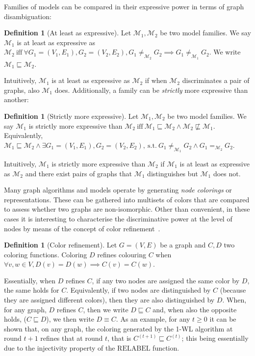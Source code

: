 \documentclass{article}
\theoremstyle{plain}
\theoremstyle{definition}
\newtheorem{definition}[theorem]{Definition}
\theoremstyle{remark}
\begin{document}
Families of models can be compared in their expressive power in terms of graph disambiguation:
\begin{definition}[At least as expressive]\label{def:at_least_as_expressive}
    Let $\mathcal{M}_1, \mathcal{M}_2$ be two model families. We say $\mathcal{M}_1$ is at least as expressive as $\mathcal{M}_2\ \mathrm{iff}\ \forall G_1 = (V_1, E_1), G_2 = (V_2, E_2), G_1 \neq_{\mathcal{M}_2} G_2 \implies G_1 \neq_{\mathcal{M}_1} G_2$. We write $\mathcal{M}_1 \sqsubseteq \mathcal{M}_2$.
\end{definition}

Intuitively, $\mathcal{M}_1$ is at least as expressive as $\mathcal{M}_2$ if when $\mathcal{M}_2$ discriminates a pair of graphs, also $\mathcal{M}_1$ does. Additionally, a family can be \emph{strictly} more expressive than another:

\begin{definition}[Strictly more expressive] \label{def:strictly_more_expressive}
    Let $\mathcal{M}_1, \mathcal{M}_2$ be two model families. We say $\mathcal{M}_1$ is strictly more expressive than $\mathcal{M}_2\ \mathrm{iff}\ \mathcal{M}_1 \sqsubseteq \mathcal{M}_2 \land \mathcal{M}_2 \not\sqsubseteq \mathcal{M}_1$. Equivalently, $\mathcal{M}_1 \sqsubseteq \mathcal{M}_2 \land \exists G_1 = (V_1, E_1), G_2 = (V_2, E_2),
    \ \mathrm{s.t.}\ G_1 \neq_{\mathcal{M}_1} G_2 \land G_1 =_{\mathcal{M}_2} G_2$.
\end{definition}

Intuitively, $\mathcal{M}_1$ is strictly more expressive than $\mathcal{M}_2$ if $\mathcal{M}_1$ is at least as expressive as $\mathcal{M}_2$ and there exist pairs of graphs that $\mathcal{M}_1$ distinguishes but $\mathcal{M}_1$ does not. 

Many graph algorithms and models operate by generating \emph{node colorings} or representations. These can be gathered into multisets of colors that are compared to assess whether two graphs are non-isomorphic. Other than convenient, in these cases it is interesting to characterise the discriminative power at the level of nodes by means of the concept of {color refinement}~\cite{morris2019weisfeiler,bodnar2022neural,bevilacqua2022equivariant}. 
\begin{definition}[Color refinement]
    Let $G = (V, E)$ be a graph and $C, D$ two coloring functions. Coloring $D$ refines colouring $C$ when $\forall v, w \in V, D(v) = D(w) \implies C(v) = C(w)$.
\end{definition}
\noindent Essentially, when $D$ refines $C$, if any two nodes are assigned the same color by $D$, the same holds for $C$. Equivalently, if two nodes are distinguished by $C$ (because they are assigned different colors), then they are also distinguished by $D$. When, for any graph, $D$ refines $C$, then we write $D \sqsubseteq C$ and, when also the opposite holds, ($C \sqsubseteq D$), we then write $D \equiv C$. As an example, for any $t \geq 0$ it can be shown that, on any graph, the coloring generated by the 1-WL algorithm at round $t+1$ refines that at round $t$, that is $C^{(t+1)} \sqsubseteq C^{(t)}$; this being essentially due to the injectivity property of the $\mathrm{RELABEL}$ function.
\end{document}
